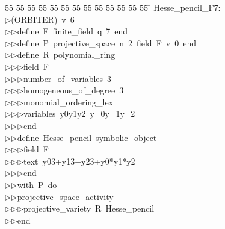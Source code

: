 %
%
\begin{tabbing}
55 \= 55 \= 55 \= 55 \= 55 \= 55 \= 55 \= 55 \= 55 \= 55 \= 55 \= 55 \= 55 \= \kill
Hesse\_pencil\_F7:\\[0pt]
$\triangleright$\>(ORBITER)\ v\ 6\ \\[0pt]
$\triangleright$\>$\triangleright$\>define\ F\ finite\_field\ q\ 7\ end\ \\[0pt]
$\triangleright$\>$\triangleright$\>define\ P\ projective\_space\ n\ 2\ field\ F\ v\ 0\ end\ \\[0pt]
$\triangleright$\>$\triangleright$\>define\ R\ polynomial\_ring\ \\[0pt]
$\triangleright$\>$\triangleright$\>$\triangleright$\>field\ F\ \\[0pt]
$\triangleright$\>$\triangleright$\>$\triangleright$\>number\_of\_variables\ 3\ \\[0pt]
$\triangleright$\>$\triangleright$\>$\triangleright$\>homogeneous\_of\_degree\ 3\ \\[0pt]
$\triangleright$\>$\triangleright$\>$\triangleright$\>monomial\_ordering\_lex\ \\[0pt]
$\triangleright$\>$\triangleright$\>$\triangleright$\>variables\ y0y1y2\ y\_0y\_1y\_2\ \\[0pt]
$\triangleright$\>$\triangleright$\>$\triangleright$\>end\ \\[0pt]
$\triangleright$\>$\triangleright$\>define\ Hesse\_pencil\ symbolic\_object\ \\[0pt]
$\triangleright$\>$\triangleright$\>$\triangleright$\>field\ F\ \\[0pt]
$\triangleright$\>$\triangleright$\>$\triangleright$\>text\ y03+y13+y23+y0*y1*y2\ \\[0pt]
$\triangleright$\>$\triangleright$\>$\triangleright$\>end\ \\[0pt]
$\triangleright$\>$\triangleright$\>with\ P\ do\ \\[0pt]
$\triangleright$\>$\triangleright$\>projective\_space\_activity\ \\[0pt]
$\triangleright$\>$\triangleright$\>$\triangleright$\>projective\_variety\ R\ Hesse\_pencil\ \ \\[0pt]
$\triangleright$\>$\triangleright$\>end\\[0pt]
\end{tabbing}
